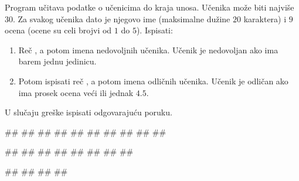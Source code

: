 \begin{Exercise}[label=struc.14]
Program učitava podatke o učenicima do kraja unosa. Učenika može biti
najviše $30$.  Za svakog učenika dato je njegovo ime (maksimalne
dužine $20$ karaktera) i $9$ ocena (ocene su celi brojvi od $1$ do
$5$).  Ispisati:
\begin{enumerate}
\item Reč , a potom imena nedovoljnih učenika.
  Učenik je nedovoljan ako ima barem jednu jedinicu.
\item Potom ispisati reč , a potom imena odličnih
  učenika.  Učenik je odličan ako ima prosek ocena veći ili jednak
  $4.5$.
\end{enumerate}
U slučaju greške ispisati odgovarajuću poruku.

\begin{maxitest}
\begin{upotreba}{1}
#\naslovInt#
##
##
##
##
##
##
#\izlaz{\ }#
##
##
\end{upotreba}
\end{maxitest}

\begin{maxitest}
\begin{upotreba}{2}
#\naslovInt#
##
##
##
##
#\izlaz{\ }#
##
##
\end{upotreba}
\end{maxitest}

\begin{maxitest}
\begin{upotreba}{3}
#\naslovInt#
##
##
##
\end{upotreba}
\end{maxitest}

\end{Exercise}
\ifresenja
\begin{Answer}[ref=struc.14]
\end{Answer}
\fi

